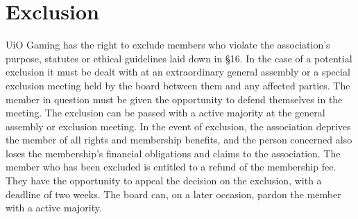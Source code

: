\documentclass[12pt,a4paper,norsk]{article}
\begin{document}
\section{Exclusion}

UiO Gaming has the right to exclude members who violate the association's purpose, statutes or ethical guidelines laid down in §16. In the case of a potential exclusion it must be dealt with at an extraordinary general assembly or a special exclusion meeting held by the board between them and any affected parties. The member in question must be given the opportunity to defend themselves in the meeting. The exclusion can be passed with a  active majority at the general assembly or exclusion meeting. In the event of exclusion, the association deprives the member of all rights and membership benefits, and the person concerned also loses the membership's financial obligations and claims to the association. The member who has been excluded is entitled to a refund of the membership fee. They have the opportunity to appeal the decision on the exclusion, with a deadline of two weeks. The board can, on a later occasion, pardon the member with a  active majority.
\end{document}

